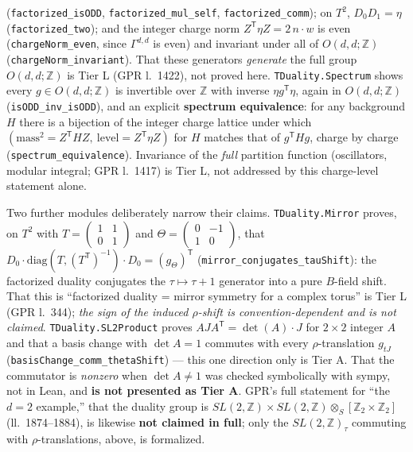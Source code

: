\documentclass[11pt,a4paper]{article}
\theoremstyle{remark}
\begin{document}
(\texttt{factorized\_\discretionary{}{}{}isODD}, \texttt{factorized\_\discretionary{}{}{}mul\_\discretionary{}{}{}self},
\texttt{factorized\_\discretionary{}{}{}comm}); on $T^2$, $D_0D_1=\eta$
(\texttt{factorized\_\discretionary{}{}{}two}); and the integer charge norm $Z^{\mathsf T}\eta Z=2\,n\cdot w$
is even (\texttt{chargeNorm\_\discretionary{}{}{}even}, since $\Gamma^{d,d}$ is even) and invariant
under all of $O(d,d;\mathbb Z)$ (\texttt{chargeNorm\_\discretionary{}{}{}invariant}). That these
generators \emph{generate} the full group $O(d,d;\mathbb Z)$ is Tier L (GPR l.~1422), not proved here.
\texttt{TDuality.Spectrum} shows every $g\in O(d,d;\mathbb Z)$ is invertible over $\mathbb Z$ with
inverse $\eta g^{\mathsf T}\eta$, again in $O(d,d;\mathbb Z)$
(\texttt{isODD\_\discretionary{}{}{}inv\_\discretionary{}{}{}isODD}), and an explicit \textbf{spectrum
equivalence}: for any background $H$ there is a bijection of the integer charge lattice under which
$(\text{mass}^2=Z^{\mathsf T}HZ,\ \text{level}=Z^{\mathsf T}\eta Z)$ for $H$ matches that of
$g^{\mathsf T}Hg$, charge by charge (\texttt{spectrum\_\discretionary{}{}{}equivalence}). Invariance of
the \emph{full} partition function (oscillators, modular integral; GPR l.~1417) is Tier L, not
addressed by this charge-level statement alone.

Two further modules deliberately narrow their claims. \texttt{TDuality.Mirror} proves, on $T^2$ with
$T=\begin{pmatrix}1&1\\0&1\end{pmatrix}$ and $\Theta=\begin{pmatrix}0&-1\\1&0\end{pmatrix}$,
that $D_0\cdot\mathrm{diag}(T,(T^{\mathsf T})^{-1})\cdot D_0=(g_\Theta)^{\mathsf T}$
(\texttt{mirror\_\discretionary{}{}{}conjugates\_\discretionary{}{}{}tauShift}): the factorized
duality conjugates the $\tau\mapsto\tau+1$ generator into a pure $B$-field shift. That this is
``factorized duality = mirror symmetry for a complex torus'' is Tier L (GPR l.~344); \emph{the sign of
the induced $\rho$-shift is convention-dependent and is not claimed}. \texttt{TDuality.SL2Product}
proves $AJA^{\mathsf T}=\det(A)\cdot J$ for $2\times2$ integer $A$ and that a basis change with
$\det A=1$ commutes with every $\rho$-translation $g_{tJ}$
(\texttt{basisChange\_\discretionary{}{}{}comm\_\discretionary{}{}{}thetaShift}) --- this one direction
only is Tier A. That the commutator is \emph{nonzero} when $\det A\ne1$ was checked symbolically with
sympy, not in Lean, and \textbf{is not presented as Tier A}. GPR's full statement for ``the $d=2$
example,'' that the duality group is $SL(2,\mathbb Z)\times SL(2,\mathbb Z)\otimes_S[\mathbb
Z_2\times\mathbb Z_2]$ (ll.~1874--1884), is likewise \textbf{not claimed in full}; only the
$SL(2,\mathbb Z)_\tau$ commuting with $\rho$-translations, above, is formalized.
\end{document}

